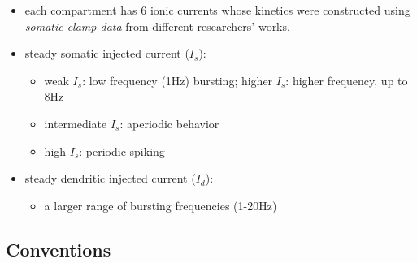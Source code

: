 \begin{itemize}
\item each compartment has 6 ionic currents whose kinetics were
  constructed using {\it somatic-clamp data} from different
  researchers' works.
\item steady somatic injected current ($I_s$):
  \begin{itemize}
  \item weak $I_s$: low frequency (1Hz) bursting; higher $I_s$: higher
    frequency, up to 8Hz
  \item intermediate $I_s$: aperiodic behavior
  \item high $I_s$: periodic spiking
  \end{itemize}
\item steady dendritic injected current ($I_d$):
  \begin{itemize}
  \item a larger range of bursting frequencies (1-20Hz)
  \end{itemize}
\end{itemize}

\subsection{Conventions}
\label{sec:conventions}


